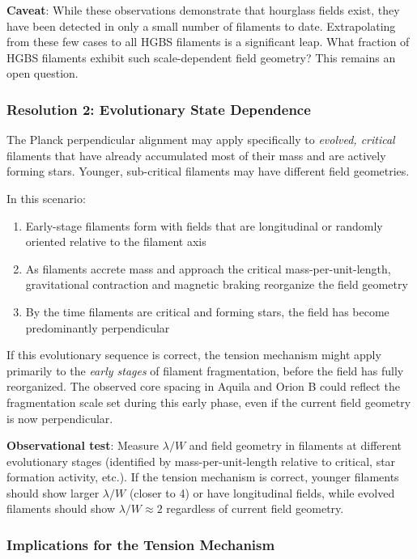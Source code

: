 \documentclass[11pt,a4paper]{article}
\begin{document}
\textbf{Caveat}: While these observations demonstrate that hourglass fields exist, they have been detected in only a small number of filaments to date. Extrapolating from these few cases to all HGBS filaments is a significant leap. What fraction of HGBS filaments exhibit such scale-dependent field geometry? This remains an open question.

\subsubsection{Resolution 2: Evolutionary State Dependence}

The Planck perpendicular alignment may apply specifically to \emph{evolved, critical} filaments that have already accumulated most of their mass and are actively forming stars. Younger, sub-critical filaments may have different field geometries.

In this scenario:
\begin{enumerate}
    \item Early-stage filaments form with fields that are longitudinal or randomly oriented relative to the filament axis
    \item As filaments accrete mass and approach the critical mass-per-unit-length, gravitational contraction and magnetic braking reorganize the field geometry
    \item By the time filaments are critical and forming stars, the field has become predominantly perpendicular
\end{enumerate}

If this evolutionary sequence is correct, the tension mechanism might apply primarily to the \emph{early stages} of filament fragmentation, before the field has fully reorganized. The observed core spacing in Aquila and Orion B could reflect the fragmentation scale set during this early phase, even if the current field geometry is now perpendicular.

\textbf{Observational test}: Measure $\lambda/W$ and field geometry in filaments at different evolutionary stages (identified by mass-per-unit-length relative to critical, star formation activity, etc.). If the tension mechanism is correct, younger filaments should show larger $\lambda/W$ (closer to 4) or have longitudinal fields, while evolved filaments should show $\lambda/W \approx 2$ regardless of current field geometry.

\subsubsection{Implications for the Tension Mechanism}
\end{document}
